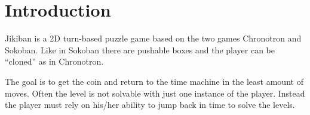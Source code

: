 \section{Introduction} 
Jikiban is a 2D turn-based puzzle game based on the two games
Chronotron and Sokoban. Like in Sokoban there are pushable boxes and
the player can be ``cloned'' as in Chronotron.

The goal is to get the coin and return to the time machine in the
least amount of moves.  Often the level is not solvable with just one
instance of the player.  Instead the player must rely on his/her ability
to jump back in time to solve the levels.

